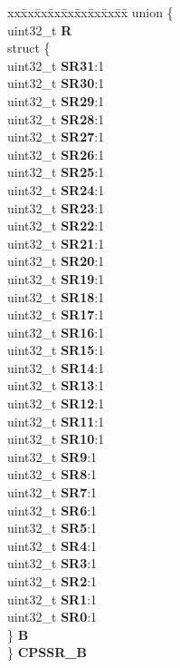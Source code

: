 \begin{DoxyCompactItemize}
\begin{tabbing}
\end{tabbing}\item 
\mbox{\label{structETPU__tag_a82e33d738c3fefb5d63a8d16763cec99}} 
\begin{tabbing}
xx\=xx\=xx\=xx\=xx\=xx\=xx\=xx\=xx\=\kill
union \{\\
\>uint32\_t {\bfseries R}\\
\>struct \{\\
\>\>uint32\_t {\bfseries SR31}:1\\
\>\>uint32\_t {\bfseries SR30}:1\\
\>\>uint32\_t {\bfseries SR29}:1\\
\>\>uint32\_t {\bfseries SR28}:1\\
\>\>uint32\_t {\bfseries SR27}:1\\
\>\>uint32\_t {\bfseries SR26}:1\\
\>\>uint32\_t {\bfseries SR25}:1\\
\>\>uint32\_t {\bfseries SR24}:1\\
\>\>uint32\_t {\bfseries SR23}:1\\
\>\>uint32\_t {\bfseries SR22}:1\\
\>\>uint32\_t {\bfseries SR21}:1\\
\>\>uint32\_t {\bfseries SR20}:1\\
\>\>uint32\_t {\bfseries SR19}:1\\
\>\>uint32\_t {\bfseries SR18}:1\\
\>\>uint32\_t {\bfseries SR17}:1\\
\>\>uint32\_t {\bfseries SR16}:1\\
\>\>uint32\_t {\bfseries SR15}:1\\
\>\>uint32\_t {\bfseries SR14}:1\\
\>\>uint32\_t {\bfseries SR13}:1\\
\>\>uint32\_t {\bfseries SR12}:1\\
\>\>uint32\_t {\bfseries SR11}:1\\
\>\>uint32\_t {\bfseries SR10}:1\\
\>\>uint32\_t {\bfseries SR9}:1\\
\>\>uint32\_t {\bfseries SR8}:1\\
\>\>uint32\_t {\bfseries SR7}:1\\
\>\>uint32\_t {\bfseries SR6}:1\\
\>\>uint32\_t {\bfseries SR5}:1\\
\>\>uint32\_t {\bfseries SR4}:1\\
\>\>uint32\_t {\bfseries SR3}:1\\
\>\>uint32\_t {\bfseries SR2}:1\\
\>\>uint32\_t {\bfseries SR1}:1\\
\>\>uint32\_t {\bfseries SR0}:1\\
\>\} {\bfseries B}\\
\} {\bfseries CPSSR\_B}\\


\end{tabbing}
\end{DoxyCompactItemize}
